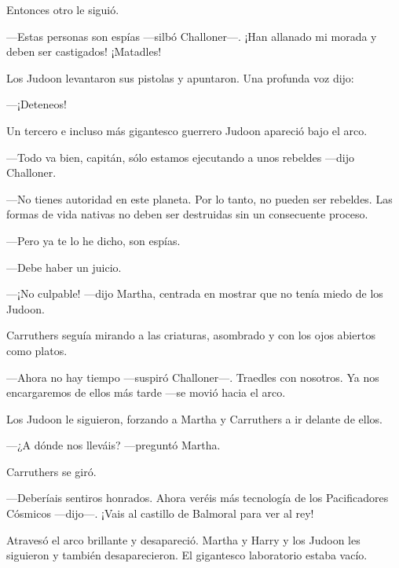 Entonces otro le siguió.

---Estas personas son espías ---silbó Challoner---. ¡Han allanado mi
morada y deben ser castigados! ¡Matadles!

Los Judoon levantaron sus pistolas y apuntaron. Una profunda voz dijo:

---¡Deteneos!

Un tercero e incluso más gigantesco guerrero Judoon apareció bajo el
arco.

---Todo va bien, capitán, sólo estamos ejecutando a unos rebeldes
---dijo Challoner.

---No tienes autoridad en este planeta. Por lo tanto, no pueden ser
rebeldes. Las formas de vida nativas no deben ser destruidas sin un
consecuente proceso.

---Pero ya te lo he dicho, son espías.

---Debe haber un juicio.

---¡No culpable! ---dijo Martha, centrada en mostrar que no tenía miedo
de los Judoon.

Carruthers seguía mirando a las criaturas, asombrado y con los ojos
abiertos como platos.

---Ahora no hay tiempo ---suspiró Challoner---. Traedles con nosotros.
Ya nos encargaremos de ellos más tarde ---se movió hacia el arco.

Los Judoon le siguieron, forzando a Martha y Carruthers a ir delante de
ellos.

---¿A dónde nos lleváis? ---preguntó Martha.

Carruthers se giró.

---Deberíais sentiros honrados. Ahora veréis más tecnología de los
Pacificadores Cósmicos ---dijo---. ¡Vais al castillo de Balmoral para
ver al rey!

Atravesó el arco brillante y desapareció. Martha y Harry y los Judoon
les siguieron y también desaparecieron. El gigantesco laboratorio estaba
vacío.